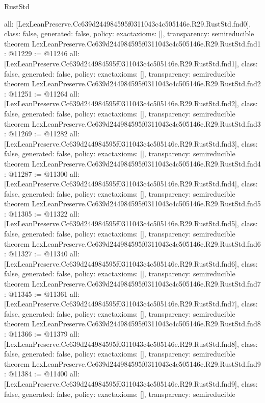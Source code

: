 \begin{lexlean}{RustStd}
\begin{coremodule}
{  all: [LexLeanPreserve.Cc639d244984595f0311043c4c505146e.R29.RustStd.fnd0],
  class: false,
  generated: false,
  policy: exact{axioms: []},
  transparency: semireducible
}
theorem LexLeanPreserve.Cc639d244984595f0311043c4c505146e.R29.RustStd.fnd1 : @11229 := @11246 {
  all: [LexLeanPreserve.Cc639d244984595f0311043c4c505146e.R29.RustStd.fnd1],
  class: false,
  generated: false,
  policy: exact{axioms: []},
  transparency: semireducible
}
theorem LexLeanPreserve.Cc639d244984595f0311043c4c505146e.R29.RustStd.fnd2 : @11251 := @11264 {
  all: [LexLeanPreserve.Cc639d244984595f0311043c4c505146e.R29.RustStd.fnd2],
  class: false,
  generated: false,
  policy: exact{axioms: []},
  transparency: semireducible
}
theorem LexLeanPreserve.Cc639d244984595f0311043c4c505146e.R29.RustStd.fnd3 : @11269 := @11282 {
  all: [LexLeanPreserve.Cc639d244984595f0311043c4c505146e.R29.RustStd.fnd3],
  class: false,
  generated: false,
  policy: exact{axioms: []},
  transparency: semireducible
}
theorem LexLeanPreserve.Cc639d244984595f0311043c4c505146e.R29.RustStd.fnd4 : @11287 := @11300 {
  all: [LexLeanPreserve.Cc639d244984595f0311043c4c505146e.R29.RustStd.fnd4],
  class: false,
  generated: false,
  policy: exact{axioms: []},
  transparency: semireducible
}
theorem LexLeanPreserve.Cc639d244984595f0311043c4c505146e.R29.RustStd.fnd5 : @11305 := @11322 {
  all: [LexLeanPreserve.Cc639d244984595f0311043c4c505146e.R29.RustStd.fnd5],
  class: false,
  generated: false,
  policy: exact{axioms: []},
  transparency: semireducible
}
theorem LexLeanPreserve.Cc639d244984595f0311043c4c505146e.R29.RustStd.fnd6 : @11327 := @11340 {
  all: [LexLeanPreserve.Cc639d244984595f0311043c4c505146e.R29.RustStd.fnd6],
  class: false,
  generated: false,
  policy: exact{axioms: []},
  transparency: semireducible
}
theorem LexLeanPreserve.Cc639d244984595f0311043c4c505146e.R29.RustStd.fnd7 : @11345 := @11361 {
  all: [LexLeanPreserve.Cc639d244984595f0311043c4c505146e.R29.RustStd.fnd7],
  class: false,
  generated: false,
  policy: exact{axioms: []},
  transparency: semireducible
}
theorem LexLeanPreserve.Cc639d244984595f0311043c4c505146e.R29.RustStd.fnd8 : @11366 := @11379 {
  all: [LexLeanPreserve.Cc639d244984595f0311043c4c505146e.R29.RustStd.fnd8],
  class: false,
  generated: false,
  policy: exact{axioms: []},
  transparency: semireducible
}
theorem LexLeanPreserve.Cc639d244984595f0311043c4c505146e.R29.RustStd.fnd9 : @11384 := @11400 {
  all: [LexLeanPreserve.Cc639d244984595f0311043c4c505146e.R29.RustStd.fnd9],
  class: false,
  generated: false,
  policy: exact{axioms: []},
  transparency: semireducible
}
\end{coremodule}
\end{lexlean}
